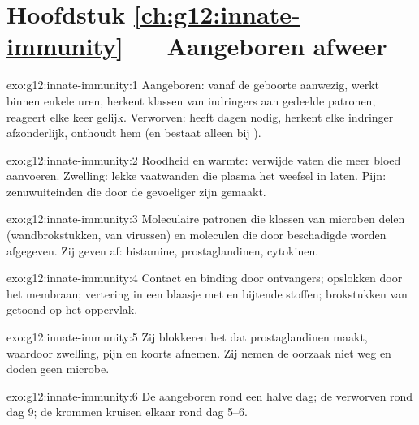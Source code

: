 \section*{Hoofdstuk \ref{ch:g12:innate-immunity} --- Aangeboren afweer}

\begin{solution}{exo:g12:innate-immunity:1}
Aangeboren: vanaf de geboorte aanwezig, werkt binnen enkele uren, herkent
klassen van indringers aan gedeelde patronen, reageert elke keer gelijk.
Verworven: heeft dagen nodig, herkent elke indringer afzonderlijk,
onthoudt hem (en bestaat alleen bij ).
\end{solution}

\begin{solution}{exo:g12:innate-immunity:2}
Roodheid en warmte: verwijde vaten die meer bloed aanvoeren. Zwelling:
lekke vaatwanden die plasma het weefsel in laten. Pijn: zenuwuiteinden die
door de  gevoeliger zijn gemaakt.
\end{solution}

\begin{solution}{exo:g12:innate-immunity:3}
Moleculaire patronen die klassen van microben delen (wandbrokstukken,
 van virussen) en moleculen die door beschadigde 
worden afgegeven. Zij geven  af: histamine, prostaglandinen,
cytokinen.
\end{solution}

\begin{solution}{exo:g12:innate-immunity:4}
Contact en binding door ontvangers; opslokken door het membraan;
vertering in een blaasje met  en bijtende stoffen; brokstukken van
 getoond op het oppervlak.
\end{solution}

\begin{solution}{exo:g12:innate-immunity:5}
Zij blokkeren het  dat prostaglandinen maakt, waardoor zwelling, pijn
en koorts afnemen. Zij nemen de oorzaak niet weg en doden geen microbe.
\end{solution}

\begin{solution}{exo:g12:innate-immunity:6}
De aangeboren rond een halve dag; de verworven rond dag 9; de krommen
kruisen elkaar rond dag 5--6.
\end{solution}

